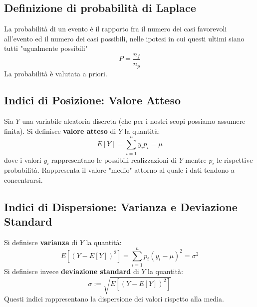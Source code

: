 \subsection{Definizione di probabilità di Laplace}
La probabilità di un evento è il rapporto fra il numero dei casi favorevoli all'evento ed il numero dei casi possibili, nelle ipotesi in cui questi ultimi siano tutti "ugualmente possibili"
\begin{equation}
	P=\frac{n_f}{n_p}
\end{equation}
La probabilità è valutata a priori.


\subsection{Indici di Posizione: Valore Atteso}
Sia $Y$ una variabile aleatoria discreta (che per i nostri scopi possiamo assumere finita). Si definisce \textbf{valore atteso} di $Y$ la quantità:
\begin{equation}
    E[Y] = \sum_{i=1}^{n} y_i p_i = \mu
\end{equation}
dove i valori $y_i$ rappresentano le possibili realizzazioni di $Y$ mentre $p_i$ le rispettive probabilità. Rappresenta il valore "medio" attorno al quale i dati tendono a concentrarsi.
\subsection{Indici di Dispersione: Varianza e Deviazione Standard}
Si definisce \textbf{varianza} di $Y$ la quantità:
\begin{equation}
    E[(Y-E[Y])^2]= \sum_{i=1}^{n}p_i(y_i - \mu)^2 = \sigma^2
\end{equation}
Si definisce invece \textbf{deviazione standard} di $Y$ la quantità:
\begin{equation}
    \sigma := \sqrt{E[(Y-E[Y])^2]}
\end{equation}
Questi indici rappresentano la dispersione dei valori rispetto alla media.

